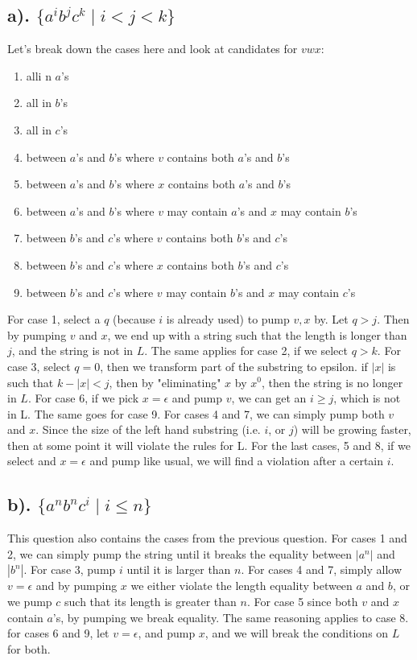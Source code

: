 \documentclass[20pt]{article} %
\begin{document}
\subsection{a). $\{ a^{i} b^{j} c^{k} \mid i < j < k \}$}
Let's break down the cases here and look at candidates for $vwx$:
\begin{enumerate}
\item alli n $a$'s
\item all in $b$'s
\item all in $c$'s
\item between $a$'s and $b$'s where $v$ contains both $a$'s and $b$'s
\item between $a$'s and $b$'s where $x$ contains both $a$'s and $b$'s
\item between $a$'s and $b$'s where $v$ may contain $a$'s and $x$ may contain $b$'s
\item between $b$'s and $c$'s where $v$ contains both $b$'s and $c$'s
\item between $b$'s and $c$'s where $x$ contains both $b$'s and $c$'s
\item between $b$'s and $c$'s where $v$ may contain $b$'s and $x$ may contain $c$'s
\end{enumerate}
For case 1, select a $q$ (because $i$ is already used) to pump $v, x$ by.  Let $q > j$.  Then by pumping $v$ and $x$, we end up with a string such that the length is longer than $j$, and the string is not in $L$.  The same applies for case 2, if we select $q > k$.  For case 3, select $q = 0$, then we transform part of the substring to epsilon.  if $|x|$ is such that $k - |x| < j$, then by "eliminating" $x$ by $x^{0}$, then the string is no longer in $L$. For case 6, if we pick $x = \epsilon$ and pump $v$, we can get an $i \geq j$, which is not in L. The same goes for case 9.  For cases 4 and 7, we can simply pump both $v$ and $x$.  Since the size of the left hand substring (i.e. $i$, or $j$) will be growing faster, then at some point it will violate the rules for L.  For the last cases, 5 and 8, if we select and $x = \epsilon$ and pump like usual, we will find a violation after a certain $i$.
\subsection{b). $\{ a^{n} b^{n} c^{i} \mid i \leq n \}$}
This question also contains the cases from the previous question. For cases 1 and 2, we can simply pump the string until it breaks the equality between $|a^{n}|$ and $|b^{n}|$.  For case 3, pump $i$ until it is larger than $n$.  For cases 4 and 7, simply allow $v = \epsilon$ and by pumping $x$ we either violate the length equality between $a$ and $b$, or we pump $c$ such that its length is greater than $n$.  For case 5 since both $v$ and $x$ contain $a$'s, by pumping we break equality.  The same reasoning applies to case 8. for cases 6 and 9, let $v = \epsilon$, and pump $x$, and we will break the conditions on $L$ for both.
\newpage
\end{document}
